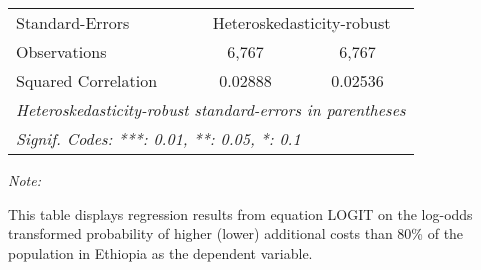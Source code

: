 \begin{table}[htbp!]
\begin{adjustbox}{width = 1\textwidth, max height = 0.95\textheight, center}
\begin{threeparttable}[b]
\begin{tabular}{lcc}
            \midrule 
            Standard-Errors & \multicolumn{2}{c}{Heteroskedasticity-robust} \\ 
            Observations         & 6,767          & 6,767\\  
            Squared Correlation  & 0.02888        & 0.02536\\  
            \midrule \midrule
            \multicolumn{3}{l}{\emph{Heteroskedasticity-robust standard-errors in parentheses}}\\
            \multicolumn{3}{l}{\emph{Signif. Codes: ***: 0.01, **: 0.05, *: 0.1}}\\
         \end{tabular}
         
         \begin{tablenotes}\item \medskip \textit{Note:}
            \item This table displays regression results from equation LOGIT on the log-odds transformed probability of higher (lower) additional costs than 80\% of the population in Ethiopia as the dependent variable. 
         \end{tablenotes}
      \end{threeparttable}
   \end{adjustbox}
\end{table}


